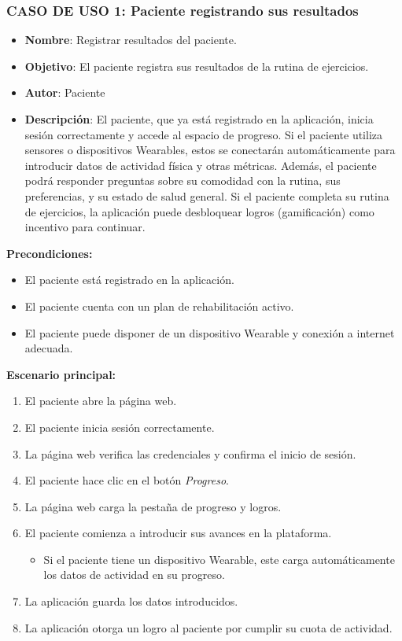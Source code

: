 \documentclass{article}
\begin{document}
\subsubsection*{CASO DE USO 1: Paciente registrando sus resultados}

\begin{itemize}
	\item \textbf{Nombre}: Registrar resultados del paciente.
	\item \textbf{Objetivo}: El paciente registra sus resultados de la rutina de ejercicios.
	\item \textbf{Autor}: Paciente
	\item \textbf{Descripción}: 
	El paciente, que ya está registrado en la aplicación, inicia sesión correctamente y accede al espacio de progreso. Si el paciente utiliza sensores o dispositivos Wearables, estos se conectarán automáticamente para introducir datos de actividad física y otras métricas. Además, el paciente podrá responder preguntas sobre su comodidad con la rutina, sus preferencias, y su estado de salud general. Si el paciente completa su rutina de ejercicios, la aplicación puede desbloquear logros (gamificación) como incentivo para continuar.
\end{itemize}

\textbf{Precondiciones:}
\begin{itemize}
	\item El paciente está registrado en la aplicación.
	\item El paciente cuenta con un plan de rehabilitación activo.
	\item El paciente puede disponer de un dispositivo Wearable y conexión a internet adecuada.
\end{itemize}

\textbf{Escenario principal:}
\begin{enumerate}
	\item El paciente abre la página web.
	\item El paciente inicia sesión correctamente.
	\item La página web verifica las credenciales y confirma el inicio de sesión.
	\item El paciente hace clic en el botón \textit{Progreso}.
	\item La página web carga la pestaña de progreso y logros.
	\item El paciente comienza a introducir sus avances en la plataforma.
	\begin{itemize}
		\item Si el paciente tiene un dispositivo Wearable, este carga automáticamente los datos de actividad en su progreso.
	\end{itemize}
	\item La aplicación guarda los datos introducidos.
	\item La aplicación otorga un logro al paciente por cumplir su cuota de actividad.
\end{enumerate}
\end{document}
